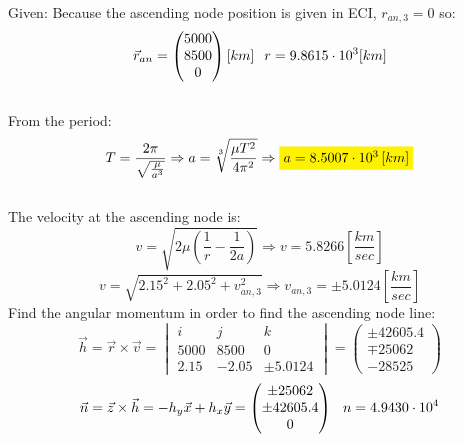 Given:
Because the ascending node position is given in ECI, $ r_{an, 3} = 0$ so: 
\begin{equation}
    \vec{r}_{an} = \begin{pmatrix}
            5000\\8500\\0
        \end{pmatrix} [km] \hspace{0.25cm} r = 9.8615 \cdot 10^3 [km]
\end{equation}
\\
From the period:
\begin{equation}
    T = \frac{2\pi}{\sqrt{\frac{\mu}{a^3}}}
    \Rightarrow
    a = \sqrt[3]{\frac{\mu T^2}{4\pi ^2}}
    \Rightarrow
    \colorbox{yellow}{$a = 8.5007 \cdot 10^3 \left[km\right]$}
\end{equation}
\\
The velocity at the ascending node is:
\begin{equation}
    v = \sqrt{2\mu \left(\frac{1}{r} - \frac{1}{2a}\right)}
    \Rightarrow
    v = 5.8266 \left[\frac{km}{sec}\right] 
\end{equation}
\begin{equation}
    v = \sqrt{2.15^2 + 2.05^2 + v_{an, 3}^2} 
    \Rightarrow
    v_{an, 3} = \pm 5.0124 \left[\frac{km}{sec}\right] 
\end{equation}
Find the angular momentum in order to find the ascending node line:
\begin{equation}
    \vec{h} = \vec{r} \times \vec{v} = \begin{vmatrix}
        i & j & k \\ 5000 & 8500 & 0 \\ 2.15 & -2.05 & \pm 5.0124
    \end{vmatrix} = \begin{pmatrix}
        \pm 42605.4 \\ \mp 25062 \\ -28525
    \end{pmatrix}
\end{equation}
\begin{equation}
    \vec{n} = \vec{z} \times \vec{h} = -h_y\vec{x}+h_x\vec{y} = \begin{pmatrix}
        \pm 25062 \\ \pm 42605.4 \\ 0
    \end{pmatrix}
    \hspace{0.25cm} n = 4.9430\cdot 10^4
\end{equation}
